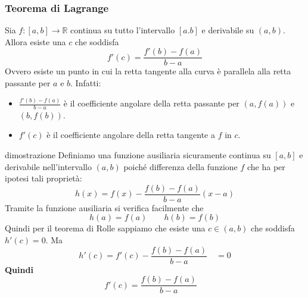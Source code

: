 \documentclass[x11names]{article}
\begin{document}
\begin{center}
\colorbox{myred}{\begin{minipage}{5.75in}
\begin{redes}{}
\subsubsection{Teorema di Lagrange}
Sia $f: [a,b] \to \mathbb{R}$ continua su tutto l'intervallo $[a.b]$ e derivabile su $(a,b)$. Allora esiste una $c$ che soddisfa
\[
f'(c) = \frac{f'(b) - f(a)}{b - a}
\]
Ovvero esiste un punto in cui la retta tangente alla curva è parallela alla retta passante per $a$ e $b$. Infatti:
\begin{itemize}
    \item $\frac{f'(b) - f(a)}{b - a}$ è il coefficiente angolare della retta passante per $(a,f(a))$ e $(b,f(b))$.
    \item $f'(c)$ è il coefficiente angolare della retta tangente  a $f$ in $c$.
\end{itemize}
\end{redes}
\end{minipage}}        
\end{center}
\begin{es}{dimostrazione}
Definiamo una funzione ausiliaria sicuramente continua su $[a,b]$ e derivabile nell'intervallo $(a,b)$ poiché differenza della funzione $f$ che ha per ipotesi tali proprietà:
\[
h(x) = f(x) - \frac{f(b) - f(a)}{b - a}(x-a)
\]
Tramite la funzione ausiliaria si verifica facilmente che 
\[
h(a) = f(a) \qquad h(b) = f(b)
\]
Quindi per il teorema di Rolle sappiamo che esiste una $c \in (a,b)$ che soddisfa $h'(c) = 0$. Ma 
\[
h'(c) = f'(c) - \frac{f(b) - f(a)}{b - a} \quad = 0
\]
\textbf{Quindi}
\[
f'(c) = \frac{f(b) - f(a)}{b - a} \quad 
\]
\end{es}


\begin{center}
\colorbox{myred}{\begin{minipage}{5.75in}
\begin{redes}{}

\end{redes}
\end{minipage}}        
\end{center}
\end{document}
